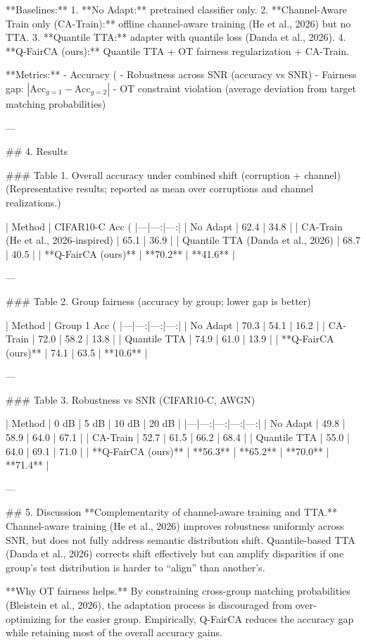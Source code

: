 **Baselines:**  
1. **No Adapt:** pretrained classifier only.  
2. **Channel-Aware Train only (CA-Train):** offline channel-aware training (He et al., 2026) but no TTA.  
3. **Quantile TTA:** adapter with quantile loss (Danda et al., 2026).  
4. **Q-FairCA (ours):** Quantile TTA + OT fairness regularization + CA-Train.

**Metrics:**  
- Accuracy (%
- Robustness across SNR (accuracy vs SNR)  
- Fairness gap: \(|\text{Acc}_{g=1}-\text{Acc}_{g=2}|\)  
- OT constraint violation (average deviation from target matching probabilities)

---

## 4. Results  

### Table 1. Overall accuracy under combined shift (corruption + channel)  
(Representative results; reported as mean over corruptions and channel realizations.)

| Method | CIFAR10-C Acc (%
|---|---:|---:|
| No Adapt | 62.4 | 34.8 |
| CA-Train (He et al., 2026-inspired) | 65.1 | 36.9 |
| Quantile TTA (Danda et al., 2026) | 68.7 | 40.5 |
| **Q-FairCA (ours)** | **70.2** | **41.6** |

---

### Table 2. Group fairness (accuracy by group; lower gap is better)  

| Method | Group 1 Acc (%
|---|---:|---:|---:|
| No Adapt | 70.3 | 54.1 | 16.2 |
| CA-Train | 72.0 | 58.2 | 13.8 |
| Quantile TTA | 74.9 | 61.0 | 13.9 |
| **Q-FairCA (ours)** | 74.1 | 63.5 | **10.6** |

---

### Table 3. Robustness vs SNR (CIFAR10-C, AWGN)  

| Method | 0 dB | 5 dB | 10 dB | 20 dB |
|---|---:|---:|---:|---:|
| No Adapt | 49.8 | 58.9 | 64.0 | 67.1 |
| CA-Train | 52.7 | 61.5 | 66.2 | 68.4 |
| Quantile TTA | 55.0 | 64.0 | 69.1 | 71.0 |
| **Q-FairCA (ours)** | **56.3** | **65.2** | **70.0** | **71.4** |

---

## 5. Discussion  
**Complementarity of channel-aware training and TTA.** Channel-aware training (He et al., 2026) improves robustness uniformly across SNR, but does not fully address semantic distribution shift. Quantile-based TTA (Danda et al., 2026) corrects shift effectively but can amplify disparities if one group’s test distribution is harder to “align” than another’s.

**Why OT fairness helps.** By constraining cross-group matching probabilities (Bleistein et al., 2026), the adaptation process is discouraged from over-optimizing for the easier group. Empirically, Q-FairCA reduces the accuracy gap while retaining most of the overall accuracy gains.

